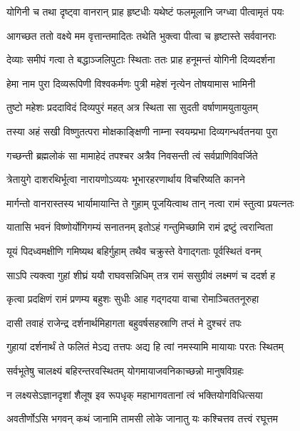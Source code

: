 \twolineshloka
{योगिनी च तथा दृष्ट्वा वानरान् प्राह हृष्टधीः}
{यथेष्टं फलमूलानि जग्ध्वा पीत्वामृतं पयः} %

\twolineshloka
{आगच्छत ततो वक्ष्ये मम वृत्तान्तमादितः}
{तथेति भुक्त्वा पीत्वा च हृष्टास्ते सर्ववानराः} %

\twolineshloka
{देव्याः समीपं गत्वा ते बद्धाञ्जलिपुटाः स्थिताः}
{ततः प्राह हनूमन्तं योगिनी दिव्यदर्शना} %

\twolineshloka
{हेमा नाम पुरा दिव्यरूपिणी विश्वकर्मणः}
{पुत्री महेशं नृत्येन तोषयामास भामिनी} %

\twolineshloka
{तुष्टो महेशः प्रददाविदं दिव्यपुरं महत्}
{अत्र स्थिता सा सुदती वर्षाणामयुतायुतम्} %

\twolineshloka
{तस्या अहं सखी विष्णुतत्परा मोक्षकाङ्क्षिणी}
{नाम्ना स्वयम्प्रभा दिव्यगन्धर्वतनया पुरा} %

\twolineshloka
{गच्छन्ती ब्रह्मलोकं सा मामाहेदं तपश्चर}
{अत्रैव निवसन्ती त्वं सर्वप्राणिविवर्जिते} %

\twolineshloka
{त्रेतायुगे दाशरथिर्भूत्वा नारायणोऽव्ययः}
{भूभारहरणार्थाय विचरिष्यति कानने} %

\twolineshloka
{मार्गन्तो वानरास्तस्य भार्यामायान्ति ते गुहाम्}
{पूजयित्वाथ तान् नत्वा रामं स्तुत्वा प्रयत्नतः} %

\twolineshloka
{यातासि भवनं विष्णोर्योगिगम्यं सनातनम्}
{इतोऽहं गन्तुमिच्छामि रामं द्रष्टुं त्वरान्विता} %

\twolineshloka
{यूयं पिदध्वमक्षीणि गमिष्यथ बहिर्गुहाम्}
{तथैव चक्रुस्ते वेगाद्गताः पूर्वस्थितं वनम्} %

\twolineshloka
{साऽपि त्यक्त्वा गुहां शीघ्रं ययौ राघवसन्निधिम्}
{तत्र रामं ससुग्रीवं लक्ष्मणं च ददर्श ह} %

\twolineshloka
{कृत्वा प्रदक्षिणं रामं प्रणम्य बहुशः सुधीः}
{आह गद्गदया वाचा रोमाञ्चिततनूरुहा} %

\twolineshloka
{दासी तवाहं राजेन्द्र दर्शनार्थमिहागता}
{बहुवर्षसहस्राणि तप्तं मे दुश्चरं तपः} %

\twolineshloka
{गुहायां दर्शनार्थं ते फलितं मेऽद्य तत्तपः}
{अद्य हि त्वां नमस्यामि मायायाः परतः स्थितम्} %

\twolineshloka
{सर्वभूतेषु चालक्ष्यं बहिरन्तरवस्थितम्}
{योगमायाजवनिकाच्छन्नो मानुषविग्रहः} %

\twolineshloka
{न लक्ष्यसेऽज्ञानदृशां शैलूष इव रूपधृक्}
{महाभागवतानां त्वं भक्तियोगविधित्सया} %

\twolineshloka
{अवतीर्णोऽसि भगवन् कथं जानामि तामसी}
{लोके जानातु यः कश्चित्तव तत्त्वं रघूत्तम} %


